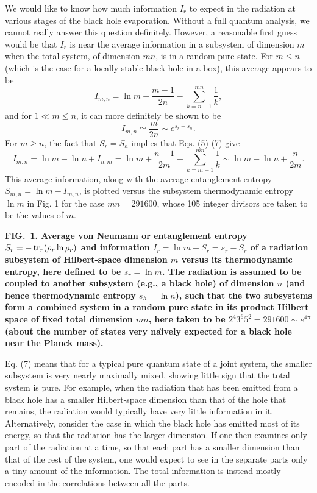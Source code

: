 \documentclass[12pt]{article}
\begin{document}
	We would like to know how much information $I_r$ to expect in
the
radiation at various stages of the black hole evaporation.  Without a
full
quantum analysis, we cannot really answer this question definitely.
However, a reasonable first guess would be that $I_r$ is near the
average
information in a subsystem of dimension $m$ when the total system,
of dimension $mn$, is in a random pure state.  For $m \leq n$
(which is the case for a locally stable black hole in a box), this
average
appears to be \cite{PagEnt}
	\begin{equation}
	I_{m,n}=\ln m + \frac{m-1}{2n}-\sum_{k=n+1}^{mn}\frac{1}{k},
	\end{equation}
and for $1 \ll m \leq n$, it can more definitely be shown to be
\cite{PagEnt}
	\begin{equation}
	I_{m,n} \simeq \frac{m}{2n} \sim e^{s_r - s_h}.
	\end{equation}
For $m \geq n$, the fact that $S_r=S_h$ implies that Eqs. (5)-(7)
give
	\begin{equation}
	I_{m,n}=\ln m - \ln n + I_{n,m}
	= \ln m + \frac{n-1}{2m}-\sum_{k=m+1}^{mn}\frac{1}{k}
	\sim \ln m - \ln n + \frac{n}{2m}.
	\end{equation}
This average information, along with the average entanglement
entropy $S_{m,n} = \ln m - I_{m,n}$, is plotted versus the subsystem
thermodynamic entropy $\ln m$ in Fig. 1 for the case $mn=291600$,
whose 105 integer divisors are taken to be the values of $m$.

\vspace{1.5 cm}
\centerline{}
\bigskip
\noindent
{\bf FIG.~1.  Average von Neumann or entanglement entropy $S_r  =
-\mathop{\hbox{tr}}_r (\rho_{r} \ln \rho_{r})$ and information
$I_r = \ln m -S_r = s_r - S_r$ of a radiation subsystem of
Hilbert-space dimension $m$ versus its thermodynamic entropy,
here defined to be $s_r = \ln m$.  The radiation is assumed to be
coupled to another subsystem (e.g., a black hole) of dimension $n$
(and hence thermodynamic entropy $s_h = \ln n$), such that the
two subsystems form a combined system in a random pure state in
its product Hilbert space of fixed total dimension $mn$,
here taken to be $2^4 3^6 5^2 = 291600\sim e^{4\pi}$
(about the number of states very na\"{\i}vely expected for
a black hole near the Planck mass).}

\newpage
	Eq. (7) means that for a typical pure quantum state of a
joint
system, the smaller subsystem is very nearly maximally mixed,
showing little sign that the total system is pure.  For example,
when the radiation that has been emitted from a black hole has
a smaller Hilbert-space dimension than that of the hole that remains,
the radiation would typically have very little information in it.
Alternatively, consider the case in which the black hole has emitted
most of its energy, so that the radiation has the larger dimension.
If one then examines only part of the radiation at a time, so that
each part has a smaller dimension than that of the rest of the
system,
one would expect to see in the separate parts only a tiny amount
of the information.  The total information is instead mostly encoded
in the correlations between all the parts.
\end{document}
